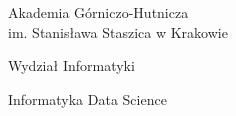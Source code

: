 \begin{titlepage}
\noindent
\begin{minipage}[t]{0.45\textwidth}
  \raggedright
  {\fontsize{10}{12}\selectfont \GetSchool\\\  \par}
  \smallskip
  {\fontsize{10}{12}\selectfont \GetDepartment \par}
    \smallskip
  {\fontsize{10}{12}\selectfont \GetDegree \par}
  \ifdefined\GetCourse
    {\fontsize{10}{12}\selectfont \GetCourse \par}
  \fi
\end{minipage}%
\hfill
\begin{minipage}[t]{0.45\textwidth}
  \raggedleft
  {\fontsize{10}{12}\selectfont Akademia Górniczo-Hutnicza\\im. Stanisława Staszica w Krakowie
 \par}
   \smallskip
  {\fontsize{10}{12}\selectfont Wydział Informatyki \par}
    \smallskip
  {\fontsize{10}{12}\selectfont Informatyka {\textemdash} Data Science \par}
  \ifdefined\GetCourse
    {\fontsize{10}{12}\selectfont \GetCourse \par}
  \fi
\end{minipage}

    
    \vspace{45pt}

\begin{center}
    
	{\noindent\fontsize{10}{12}\itshape\selectfont\GetThesisType}

    \vspace{35pt}

	{\noindent\fontsize{10}{12}\selectfont\GetDate}

\end{center}


    \vspace{18pt}
\end{titlepage}
\restoregeometry
\MediaOptionLogicBlank



